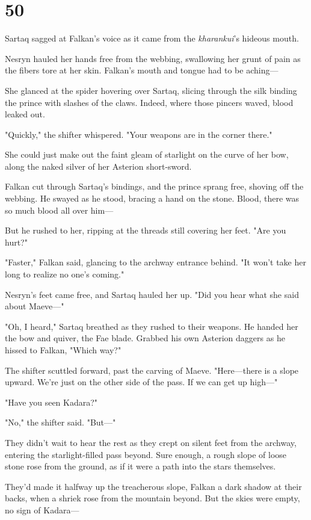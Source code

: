 
\chapter{50}

Sartaq sagged at Falkan's voice as it came from the \emph{kharankui}'s hideous mouth.

Nesryn hauled her hands free from the webbing, swallowing her grunt of pain as the fibers tore at her skin.
Falkan's mouth and tongue had to be aching---

She glanced at the spider hovering over Sartaq, slicing through the silk binding the prince with slashes of the claws.
Indeed, where those pincers waved, blood leaked out.

"Quickly," the shifter whispered.
"Your weapons are in the corner there."

She could just make out the faint gleam of starlight on the curve of her bow, along the naked silver of her Asterion short-sword.

Falkan cut through Sartaq's bindings, and the prince sprang free, shoving off the webbing.
He swayed as he stood, bracing a hand on the stone.
Blood, there was so much blood all over him---

But he rushed to her, ripping at the threads still covering her feet.
"Are you hurt?"

"Faster," Falkan said, glancing to the archway entrance behind.
"It won't take her long to realize no one's coming."

Nesryn's feet came free, and Sartaq hauled her up.
"Did you hear what she said about Maeve---"

"Oh, I heard," Sartaq breathed as they rushed to their weapons.
He handed her the bow and quiver, the Fae blade.
Grabbed his own Asterion daggers as he hissed to Falkan, "Which way?"

The shifter scuttled forward, past the carving of Maeve.
"Here---there is a slope upward.
We're just on the other side of the pass.
If we can get up high---"

"Have you seen Kadara?"

"No," the shifter said.
"But---"

They didn't wait to hear the rest as they crept on silent feet from the archway, entering the starlight-filled pass beyond.
Sure enough, a rough slope of loose stone rose from the ground, as if it were a path into the stars themselves.

They'd made it halfway up the treacherous slope, Falkan a dark shadow at their backs, when a shriek rose from the mountain beyond.
But the skies were empty, no sign of Kadara---

